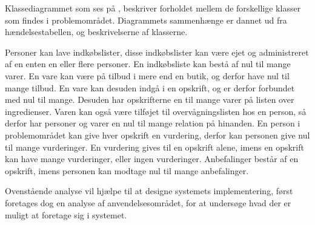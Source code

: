 Klassediagrammet som ses på , beskriver forholdet mellem de forskellige klasser som findes i problemområdet.
Diagrammets sammenhænge er dannet ud fra hændelsestabellen, og beskrivelserne af klasserne.

Personer kan lave indkøbslister, disse indkøbslister kan være ejet og administreret af en enten en eller flere personer.
En indkøbsliste kan bestå af nul til mange varer.
En vare kan være på tilbud i mere end en butik, og derfor have nul til mange tilbud.
En vare kan desuden indgå i en opskrift, og er derfor forbundet med nul til mange.
Desuden har opskrifterne en til mange varer på listen over ingredienser.
Varen kan også være tilføjet til overvågningslisten hos en person, så derfor har personer og varer en nul til mange relation på hinanden.
En person i problemområdet kan give hver opskrift en vurdering, derfor kan personen give nul til mange vurderinger.
En vurdering gives til en opskrift alene, imens en opskrift kan have mange vurderinger, eller ingen vurderinger.
Anbefalinger består af en opskrift, imens personen kan modtage nul til mange anbefalinger.


Ovenstående analyse vil hjælpe til at designe systemets implementering, først foretages dog en analyse af anvendelsesområdet, for at undersøge hvad der er muligt at foretage sig i systemet.
